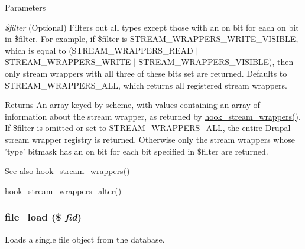 \begin{DoxyParams}{Parameters}
\item[{\em \$filter}](Optional) Filters out all types except those with an on bit for each on bit in \$filter. For example, if \$filter is STREAM\_\-WRAPPERS\_\-WRITE\_\-VISIBLE, which is equal to (STREAM\_\-WRAPPERS\_\-READ $|$ STREAM\_\-WRAPPERS\_\-WRITE $|$ STREAM\_\-WRAPPERS\_\-VISIBLE), then only stream wrappers with all three of these bits set are returned. Defaults to STREAM\_\-WRAPPERS\_\-ALL, which returns all registered stream wrappers.\end{DoxyParams}
\begin{DoxyReturn}{Returns}
An array keyed by scheme, with values containing an array of information about the stream wrapper, as returned by \hyperlink{group__hooks_ga6fadcf625a4766e7f0d97b1628b294dc}{hook\_\-stream\_\-wrappers()}. If \$filter is omitted or set to STREAM\_\-WRAPPERS\_\-ALL, the entire Drupal stream wrapper registry is returned. Otherwise only the stream wrappers whose 'type' bitmask has an on bit for each bit specified in \$filter are returned.
\end{DoxyReturn}
\begin{DoxySeeAlso}{See also}
\hyperlink{group__hooks_ga6fadcf625a4766e7f0d97b1628b294dc}{hook\_\-stream\_\-wrappers()} 

\hyperlink{group__hooks_gab7e34e537f28b019b04ab1b1d90d52c1}{hook\_\-stream\_\-wrappers\_\-alter()} 
\end{DoxySeeAlso}
\hypertarget{group__file_ga138bd2e393c743b41a642003eecbf98f}{
\subsubsection[{file\_\-load}]{\setlength{\rightskip}{0pt plus 5cm}file\_\-load (\$ {\em fid})}}
\label{group__file_ga138bd2e393c743b41a642003eecbf98f}
Loads a single file object from the database.


